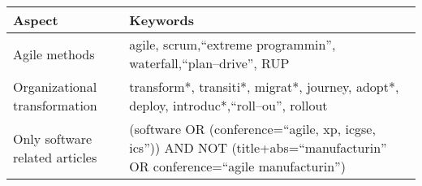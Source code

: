 \centering
{} \label{keywordtable}
\begin{tabular}{l p{30em}}
    \bfseries{Aspect} & \bfseries{Keywords} \\
    \hline
    Agile methods & agile, scrum,``extreme programmin'', waterfall,``plan–drive'', RUP \\
    Organizational transformation & transform*, transiti*, migrat*, journey, adopt*, deploy, introduc*,``roll–ou'', rollout \\
    Only software related articles & (software OR (conference=``agile, xp, icgse, ics'')) AND NOT (title+abs=``manufacturin'' OR conference=``agile manufacturin'') \\
    \hline
\end{tabular}

\justify
